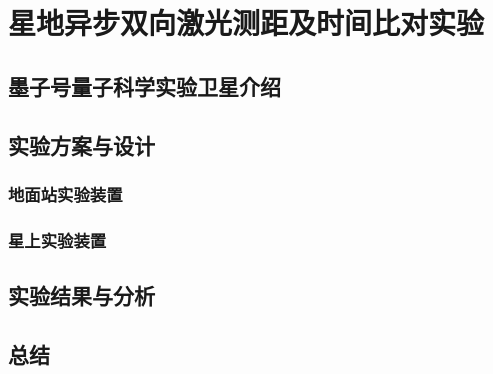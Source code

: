 \chapter{星地异步双向激光测距及时间比对实验}

\section{墨子号量子科学实验卫星介绍}

\section{实验方案与设计}
\subsection{地面站实验装置}
\subsection{星上实验装置}

\section{实验结果与分析}

\section{总结}
